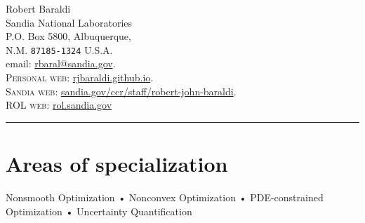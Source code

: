 \documentclass[10pt, a4paper]{article}
\begin{document}
{\LARGE Robert Baraldi}\\%
Sandia National Laboratories\\
P.O. Box 5800, Albuquerque,\\
N.M. \texttt{87185-1324}
U.S.A.\\
email: \href{mailto:rbaral@sandia.gov}{rbaral@sandia.gov}.\\
\textsc{Personal web}: \href{http://rjbaraldi.github.io}{rjbaraldi.github.io}.\\
\textsc{Sandia web}: \href{https://www.sandia.gov/ccr/staff/robert-john-baraldi/}{sandia.gov/ccr/staff/robert-john-baraldi}.\\
\textsc{ROL web}: \href{https://rol.sandia.gov/}{rol.sandia.gov}

\hrule
\section*{Areas of specialization}
Nonsmooth Optimization • Nonconvex Optimization • PDE-constrained Optimization • Uncertainty Quantification
\end{document}
